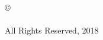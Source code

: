 
\thispagestyle{empty}
\hbox{\ }

\vfill
\renewcommand{\baselinestretch}{1}
\small\normalsize

\vspace{-.65in}

\begin{center}
\normalsize{\copyright \hbox{ }
\text{\thesisauthor}  %
\\
\hspace{1in} \\
All Rights Reserved, 2018}
\end{center}

\vfill
